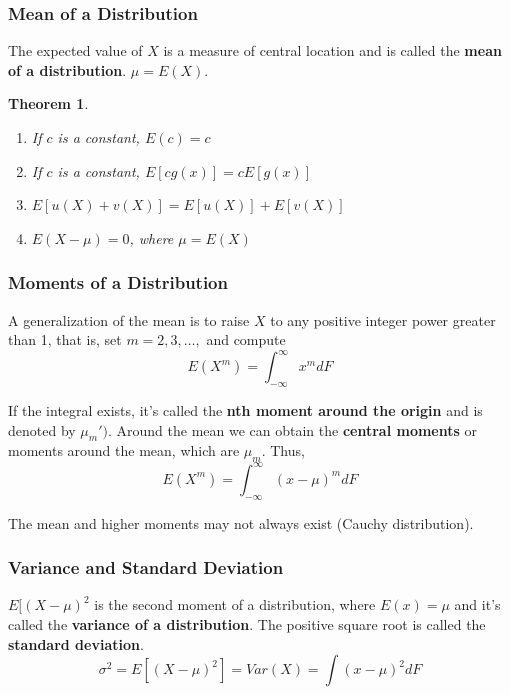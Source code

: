 \documentclass{article}
\newtheorem{theorem}{Theorem}[section]
\begin{document}
\subsubsection{Mean of a Distribution}

The expected value of \(X\) is a measure of central location and is called the \textbf{mean of a distribution}. \(\mu = E(X)\).

\begin{theorem}
\begin{enumerate} 
    \item If \(c\) is a constant, \(E(c)=c\)
    \item If \(c\) is a constant, \(E[c g(x)]=c E[g(x)]\)
    \item \(E[u(X)+v(X)] = E[u(X)]+E[v(X)]\)
    \item \(E(X-\mu)=0\), where \(\mu=E(X)\)
\end{enumerate}
\end{theorem}

\subsubsection{Moments of a Distribution}

A generalization of the mean is to raise \(X\) to any positive integer power greater than 1, that is, set \(m=2,3, \dots,\) and compute
\begin{equation*}
    E(X^m)=\int_{-\infty}^{\infty} x^m dF
\end{equation*}

If the integral exists, it's called the \textbf{nth moment around the origin} and is denoted by \(\mu_m')\). Around the mean we can obtain the \textbf{central moments} or moments around the mean, which are \(\mu_m\). Thus,
\begin{equation*}
    E(X^m)=\int_{-\infty}^{\infty} (x-\mu)^m dF
\end{equation*}

The mean and higher moments may not always exist (Cauchy distribution).

\subsubsection{Variance and Standard Deviation}

\(E[(X-\mu)^2\) is the second moment of a distribution, where \(E(x)=\mu\) and it's called the \textbf{variance of a distribution}. The positive square root is called the \textbf{standard deviation}.
\begin{equation*}
    \sigma^2= E[(X-\mu)^2] = Var(X) = \int(x-\mu)^2 dF
\end{equation*}
\end{document}

